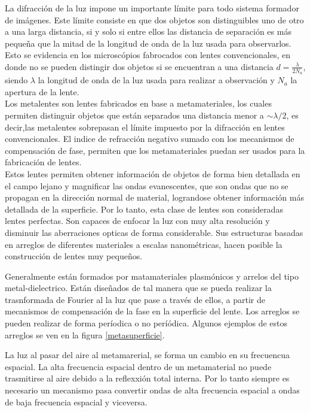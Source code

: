 \documentclass[a4paper, twocolumn, 10pt]{article}
\begin{document}
\noindent La difracción de la luz impone un importante límite para todo sistema formador de imágenes. Este límite consiste en que dos objetos son distinguibles uno de otro a una larga distancia, si y solo si entre ellos las distancia de separación es más pequeña que la mitad de la longitud de onda de la luz usada para observarlos\cite{liu2017plasmonics}. Esto se evidencia en los microscópios fabrocados con lentes convencionales, en donde no se pueden distingir dos objetos si se encuentran a una distancia $d=\frac{\lambda}{2 N_a}$, siendo $\lambda$ la longitud de onda de la luz usada para realizar a observación y $N_a$ la apertura de la lente.\\


\noindent Los metalentes son lentes fabricados en base a metamateriales, los cuales permiten distinguir objetos que están separados una distancia menor a $ \sim \lambda/2$, es decir,las metalentes sobrepasan el límite impuesto por la difracción en lentes convencionales. El indice de refracción negativo sumado con los mecanismos de compensación de fase, permiten que los metamateriales puedan ser usados para la fabricación de lentes.\\

\noindent Estos lentes permiten obtener información de objetos de forma bien detallada en el campo lejano y magnificar las ondas evanescentes, que son ondas que no se propagan en la dirección normal de material, lograndose obtener información más detallada de la superficie. Por lo tanto, esta clase de lentes son consideradas lentes perfectas. Son capaces de enfocar la luz con muy alta resolución y disminuir las aberraciones opticas de forma considerable. Sus estructuras basadas en arreglos de diferentes materiales a escalas nanométricas, hacen posible la construcción de lentes muy pequeños.


\noindent Generalmente están formados por matamateriales plasmónicos y arrelos del tipo metal-dielectrico. Están diseñados de tal manera que se pueda realizar la trasnformada de Fourier al la luz que pase a través de ellos, a partir de mecanismos de compensación de la fase en la superficie del lente. Los arreglos se pueden realizar de forma períodica o no períódica. Algunos ejemplos de estos arreglos se ven en la figura \ref{metasuperficie}.


\noindent La luz al pasar del aire al metamarerial, se forma un cambio en su frecuencua espacial. La alta frecuencia espacial dentro de un metamaterial no puede trasmitirse al aire debido a la reflexxión total interna. Por lo tanto siempre es necesario un mecanismo pasa convertir ondas de alta frecuencia espacial a ondas de baja frecuencia espacial y viceversa.
\end{document}
